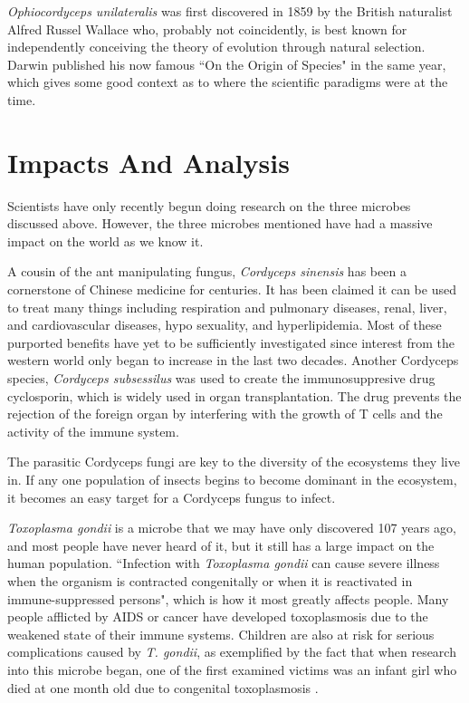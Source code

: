 \documentclass[twocolumn]{article}
\begin{document}
\textit{Ophiocordyceps unilateralis} was first discovered in 1859 by the British naturalist Alfred Russel Wallace who, probably not coincidently, is best known for independently conceiving the theory of evolution through natural selection. Darwin published his now famous ``On the Origin of Species" in the same year, which gives some good context as to where the scientific paradigms were at the time.\cite{darwin} 

\section*{Impacts And Analysis}

Scientists have only recently begun doing research on the three microbes discussed above. However, the three microbes mentioned have had a massive impact on the world as we know it. 

A cousin of the ant manipulating fungus, \textit{Cordyceps sinensis} has been a cornerstone of Chinese medicine for centuries. It has been claimed it can be used to treat many things including respiration and pulmonary diseases, renal, liver, and cardiovascular diseases, hypo sexuality, and hyperlipidemia. Most of these purported benefits have yet to be sufficiently investigated since interest from the western world only began to increase in the last two decades. \cite{medicinal_cordy} Another Cordyceps species, \textit{Cordyceps subsessilus} was used to create the immunosuppresive drug cyclosporin, which is widely used in organ transplantation. The drug prevents the rejection of the foreign organ by interfering with the growth of T cells and the activity of the immune system.\cite{cordy_tcells}

The parasitic Cordyceps fungi are key to the diversity of the ecosystems they live in. If any one population of insects begins to become dominant in the ecosystem, it becomes an easy target for a Cordyceps fungus to infect.  \cite{cordy_video}

\textit{Toxoplasma gondii} is a microbe that we may have only discovered 107 years ago, and most people have never heard of it, but it still has a large impact on the human population. ``Infection with \textit{Toxoplasma gondii} can cause severe illness when the organism is contracted congenitally or when it is reactivated in immune-suppressed persons"\cite{Tsero}, which is how it most greatly affects people. Many people afflicted by AIDS or cancer have developed toxoplasmosis due to the weakened state of their immune systems. Children are also at risk for serious complications caused by \textit{T. gondii}, as exemplified by the fact that when research into this microbe began, one of the first examined victims was an infant girl who died at one month old due to congenital toxoplasmosis \cite{Tlife_cycle}.
\end{document}
